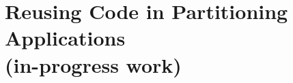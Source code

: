 \declarecommand{\sysname}{\civet{}}

\chapter{Reusing Code in Partitioning Applications\\ (in-progress work)}
\label{chap:civet}






%

